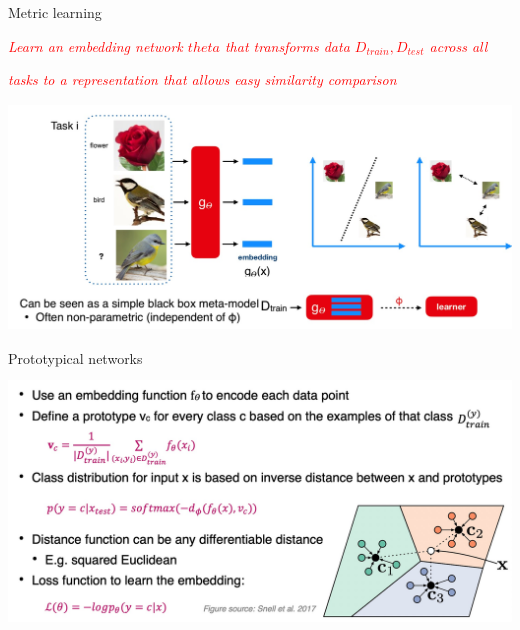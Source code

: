 \begin{frame}{Metric learning}

    \centerline{\textit{\textcolor{red}{Learn an embedding network $theta$ that transforms data ${D_{train},D_{test}}$ across all}}}
    \centerline{\textit{\textcolor{red}{tasks to a representation that allows easy similarity comparison}}}
    \centering\includegraphics[height=6cm]{image/img012823.jpg}
\end{frame}
\begin{frame}{Prototypical networks}
    \centering\includegraphics[height=7cm]{image/img013030.jpg}
\end{frame}
